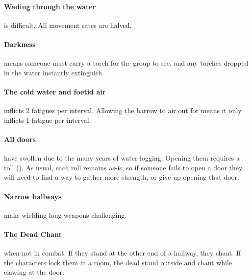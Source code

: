 
\paragraph{Wading through the water}
is difficult.
All movement rates are halved.

\paragraph{Darkness}
means someone must carry a torch for the group to see, and any torches dropped in the water instantly extinguish.

\paragraph{The cold water and foetid air}
inflicts 2 \glspl{fatigue} per \gls{interval}.
Allowing the barrow to air out for  means it only inflicts 1 \gls{fatigue} per \gls{interval}.

\paragraph{All doors}
have swollen due to the many years of water-logging.
Opening them requires a  roll (\tn[7]).
As usual, each roll remains as-is, so if someone fails to open a door they will need to find a way to gather more strength, or give up opening that door.

\paragraph{Narrow hallways}
make wielding long weapons challenging.%

\paragraph{The Dead Chant} when not in combat.
If they stand at the other end of a hallway, they chant.
If the characters lock them in a room, the dead stand outside and chant while clawing at the door.

